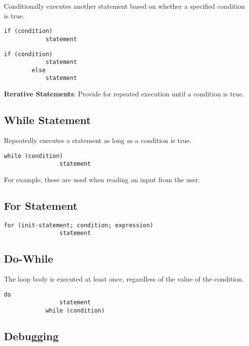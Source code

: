 \documentclass{article}
\begin{document}
	Conditionally executes another statement based on whether a specified condition is true.
	
	\begin{minipage}[t]{.45\textwidth}
		\begin{lstlisting}[gobble=12]
		if (condition)
			statement
		\end{lstlisting}
	\end{minipage}\hfill
	\begin{minipage}[t]{.45\textwidth}
		\begin{lstlisting}[gobble=12]
		if (condition)
			statement
		else
			statement
		\end{lstlisting}
	\end{minipage}
	
	\textbf{Iterative Statements}: Provide for repeated execution until a condition is true.
	
	\subsection{While Statement}
	
	Repeatedly executes a statement as long as a condition is true.
	

	\begin{lstlisting}[gobble=8]
			while (condition)
				statement
	\end{lstlisting}

	For example, these are used when reading an input from the user.
	
	\subsection{For Statement}
	
	\begin{lstlisting}[gobble=16]
			for (init-statement; condition; expression)
				statement
	\end{lstlisting}

	\subsection{Do-While}
	
	The loop body is executed at least once, regardless of the value of the condition.
	\begin{lstlisting}[gobble=8]
			do
				statement
			while (condition)
	\end{lstlisting}

	\subsection{Debugging}
	
\end{document}
